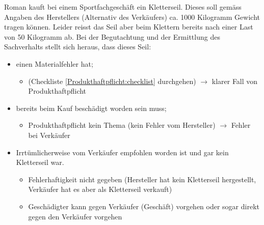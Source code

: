 Roman kauft bei einem Sportfachgeschäft ein Kletterseil. Dieses soll gemäss Angaben des Herstellers (Alternativ des Verkäufers) ca. 1000 Kilogramm Gewicht tragen können. Leider reisst das Seil aber beim Klettern bereits nach einer Last von 50 Kilogramm ab. Bei der Begutachtung und der Ermittlung des Sachverhalts stellt sich heraus, dass dieses Seil:

\begin{itemize}
    \item einen Materialfehler hat;
    \begin{itemize}
        \item (Checkliste \ref{Produkthaftpflicht:checklist} durchgehen) $\rightarrow$ klarer Fall von Produkthaftpflicht
    \end{itemize}
    \item bereits beim Kauf beschädigt worden sein muss;
    \begin{itemize}
        \item Produkthaftpflicht kein Thema (kein Fehler vom Hersteller) $\rightarrow$ Fehler bei Verkäufer
    \end{itemize}
    \item Irrtümlicherweise vom Verkäufer empfohlen worden ist und gar kein Kletterseil war.
    \begin{itemize}
        \item Fehlerhaftigkeit nicht gegeben (Hersteller hat kein Kletterseil hergestellt, Verkäufer hat es aber als Kletterseil verkauft)
        \item Geschädigter kann gegen Verkäufer (Geschäft) vorgehen oder sogar direkt gegen den Verkäufer vorgehen
    \end{itemize}
\end{itemize}